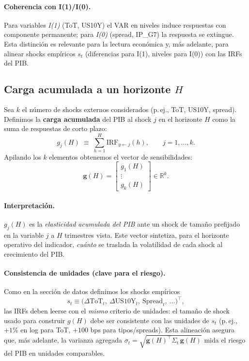 \documentclass[11pt,a4paper]{article}
\newcommand{\1}{\mathbf{1}}
\newcommand{\vect}[1]{\boldsymbol{#1}}
\begin{document}
\paragraph{Coherencia con I(1)/I(0).}
Para variables \emph{I(1)} (ToT, US10Y) el VAR en niveles induce respuestas con componente permanente; para \emph{I(0)} (spread, IP\_G7) la respuesta se extingue. Esta distinción es relevante para la lectura económica y, más adelante, para alinear shocks empíricos \(s_t\) (diferencias para I(1), niveles para I(0)) con las IRFs del PIB.

\subsection{Carga acumulada a un horizonte $H$}

Sea $k$ el número de shocks externos considerados (p.\,ej., ToT, US10Y, spread). Definimos la \textbf{carga acumulada} del PIB al shock $j$ en el horizonte $H$ como la suma de respuestas de corto plazo:
\begin{equation}
g_j(H)
\;\equiv\;
\sum_{h=1}^{H} \text{IRF}_{y \leftarrow j}(h),
\qquad
j = 1,\ldots,k.
\label{eq:g_component}
\end{equation}
Apilando los $k$ elementos obtenemos el vector de sensibilidades:
\begin{equation}
\vect{g}(H)
=
\begin{bmatrix}
g_1(H) \\ \vdots \\ g_k(H)
\end{bmatrix}
\in \mathbb{R}^{k}.
\label{eq:g_vector}
\end{equation}

\paragraph{Interpretación.}
$g_j(H)$ es la \emph{elasticidad acumulada del PIB} ante un shock de tamaño prefijado en la variable $j$ a \(H\) trimestres vista. 
Este vector sintetiza, para el horizonte operativo del indicador, \emph{cuánto} se traslada la volatilidad de cada shock al crecimiento del PIB.

\paragraph{Consistencia de unidades (clave para el riesgo).}
Como en la sección de datos definimos los shocks empíricos
\[
s_t \equiv \big(\Delta \text{ToT}_t,\ \Delta \text{US10Y}_t,\ \text{Spread}_t,\ \ldots \big)^\top,
\]
las IRFs deben leerse con el \emph{mismo} criterio de unidades: el tamaño de shock usado para construir $g(H)$ debe ser consistente con las unidades de $s_t$ (p.\,ej., \(+1\%\) en log para ToT, \(+100\) bps para tipos/spreads). Esta alineación asegura que, más adelante, la varianza agregada
\(
\sigma_t = \sqrt{ \vect{g}(H)^\top \Sigma_t\, \vect{g}(H) }
\)
mida el riesgo del PIB en unidades comparables.
\end{document}
